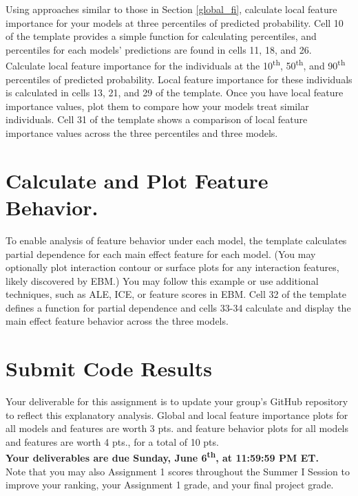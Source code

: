 \documentclass[fleqn]{article}
\begin{document}
Using approaches similar to those in Section \ref{global_fi}, calculate local feature importance for your models at three percentiles of predicted probability. Cell 10 of the template provides a simple function for calculating percentiles, and percentiles for each models' predictions are found in cells 11, 18, and 26.\\

\noindent Calculate local feature importance for the individuals at the 10\textsuperscript{th}, 50\textsuperscript{th}, and 90\textsuperscript{th} percentiles of predicted probability. Local feature importance for these individuals is calculated in cells 13, 21, and 29 of the template. Once you have local feature importance values, plot them to compare how your models treat similar individuals. Cell 31 of the template shows a comparison of local feature importance values across the three percentiles and three models.

\section{Calculate and Plot Feature Behavior.}

To enable analysis of feature behavior under each model, the template calculates partial dependence for each main effect feature for each model. (You may optionally plot interaction contour or surface plots for any interaction features, likely discovered by EBM.) You may follow this example or use additional techniques, such as ALE, ICE, or feature scores in EBM. Cell 32 of the template defines a function for partial dependence and cells 33-34 calculate and display the main effect feature behavior across the three models. 

\section{Submit Code Results}

Your deliverable for this assignment is to update your group's GitHub repository to reflect this explanatory analysis. Global and local feature importance plots for all models and features are worth 3 pts. and feature behavior plots for all models and features are worth 4 pts., for a total of 10 pts.\\

\noindent \textbf{Your deliverables are due Sunday, June 6\textsuperscript{th}, at 11:59:59 PM ET.}\\

\noindent Note that you may also Assignment 1 scores throughout the Summer I Session to improve your ranking, your Assignment 1 grade, and your final project grade.
\end{document}
